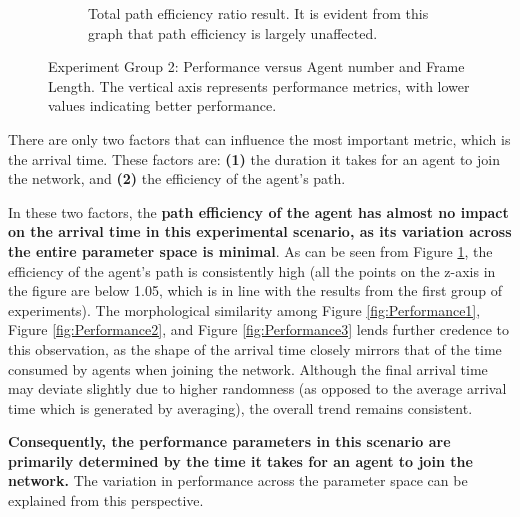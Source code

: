 \begin{figure}[htbp]
\begin{subfigure}[t]{0.45\linewidth}
        \caption{Total path efficiency ratio result. It is evident from this graph that path efficiency is largely unaffected.}
        \label{fig:Performance4}
    \end{subfigure}
    \caption{Experiment Group 2: Performance versus Agent number and Frame Length. The vertical axis represents performance metrics, with lower values indicating better performance.}
    \label{fig:Performance}
\end{figure}
\FloatBarrier

There are only two factors that can influence the most important metric, which is the arrival time. These factors are: \textbf{(1)} the duration it takes for an agent to join the network, and \textbf{(2)} the efficiency of the agent's path. 

In these two factors, the \textbf{path efficiency of the agent has almost no impact on the arrival time in this experimental scenario, as its variation across the entire parameter space is minimal}.
As can be seen from Figure \ref{fig:Performance4}, the efficiency of the agent's path is consistently high (all the points on the z-axis in the figure are below 1.05, which is in line with the results from the first group of experiments).
The morphological similarity among Figure \ref{fig:Performance1}, Figure \ref{fig:Performance2}, and Figure \ref{fig:Performance3} lends further credence to this observation, as the shape of the arrival time closely mirrors that of the time consumed by agents when joining the network.
Although the final arrival time may deviate slightly due to higher randomness (as opposed to the average arrival time which is generated by averaging), the overall trend remains consistent.


\textbf{Consequently, the performance parameters in this scenario are primarily determined by the time it takes for an agent to join the network.} The variation in performance across the parameter space can be explained from this perspective.


